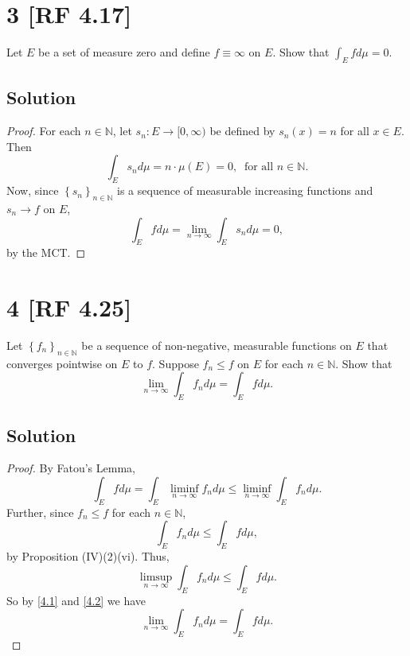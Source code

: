 \documentclass[12pt]{article}
\begin{document}
\newpage 
\section*{3 [RF 4.17]}
Let $E$ be a set of measure zero and define $f \equiv \infty$ on $E$. Show that $\int_{E}fd\mu = 0$.

\subsection*{Solution}
\begin{proof}
For each $n \in \mathbb{N}$, let $s_{n} : E \rightarrow [0,\infty)$ be defined by $s_{n}(x) = n$ for all $x \in E$. Then 
\[ \int_{E} s_{n}d\mu = n\cdot \mu(E) = 0, \ \text{ for all } n \in \mathbb{N}. \]
Now, since $\left\{ s_{n} \right\}_{n \in \mathbb{N}}$ is a sequence of measurable increasing functions and $s_{n}\rightarrow f$ on $E$,
\[ \int_{E}fd\mu = \lim_{n\rightarrow\infty}\int_{E}s_{n}d\mu = 0, \]
by the MCT.
\end{proof}



\newpage 
\section*{4 [RF 4.25]}
Let $\left\{ f_{n} \right\}_{n\in\mathbb{N}}$ be a sequence of non-negative, measurable functions on $E$ that converges pointwise on $E$ to $f$.
Suppose $f_{n} \leq f$ on $E$ for each $n \in \mathbb{N}$. Show that 
\[ \lim_{n\rightarrow\infty}\int_{E}f_{n}d\mu = \int_{E}fd\mu. \]

\subsection*{Solution} 
\begin{proof}
By Fatou's Lemma,
\begin{equation}
\int_{E}fd\mu = \int_{E}\liminf_{n\rightarrow\infty}f_{n}d\mu \leq \liminf_{n\rightarrow\infty}\int_{E}f_{n}d\mu.
\label{4.1}
\end{equation}
Further, since $f_{n} \leq f$ for each $n \in \mathbb{N}$,
\[ \int_{E}f_{n}d\mu \leq \int_{E}fd\mu,\]
by Proposition (IV)(2)(vi). Thus,
\begin{equation}
\limsup_{n\rightarrow\infty}\int_{E}f_{n}d\mu \leq \int_{E}fd\mu.
\label{4.2}
\end{equation}
So by \eqref{4.1} and \eqref{4.2} we have
\[ \lim_{n\rightarrow\infty}\int_{E}f_{n}d\mu = \int_{E}fd\mu. \]
\end{proof}
\end{document}
